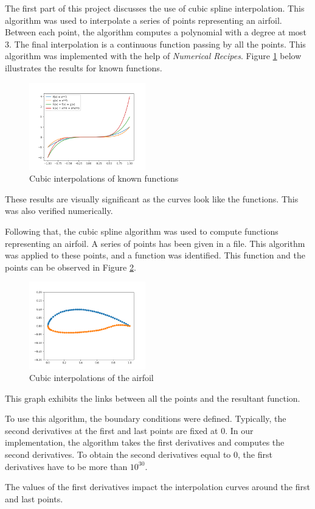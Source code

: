 The first part of this project discusses the use of cubic spline interpolation. This algorithm was used to interpolate a series of points representing an airfoil. Between each point, the algorithm computes a polynomial with a degree at most 3. The final interpolation is a continuous function passing by all the points. This algorithm was implemented with the help of \emph{Numerical Recipes}. Figure \ref{fig:interp} below illustrates the results for known functions.

\begin{figure}[h]
  \centering
  \includegraphics[width=0.45\textwidth]{img/interpolations.png}
  \caption{Cubic interpolations of known functions}
  \label{fig:interp}
\end{figure}

These results are visually significant as the curves look like the functions. This was also verified numerically.

\bigskip


Following that, the cubic spline algorithm was used to compute functions representing an airfoil. A series of points has been given in a file. This algorithm was applied to these points, and a function was identified. This function and the points can be observed in Figure \ref{fig:airfoil}.

\begin{figure}[h]
  \centering
  \includegraphics[width=0.45\textwidth]{img/airfoil_interp.png}
  \caption{Cubic interpolations of the airfoil}
  \label{fig:airfoil}
\end{figure}
  
This graph exhibits the links between all the points and the resultant function.

\bigskip

To use this algorithm, the boundary conditions were defined. Typically, the second derivatives at the first and last points are fixed at 0. In our implementation, the algorithm takes the first derivatives and computes the second derivatives. To obtain the second derivatives equal to 0, the first derivatives have to be more than $10^{30}$.

The values of the first derivatives impact the interpolation curves around the first and last points.
